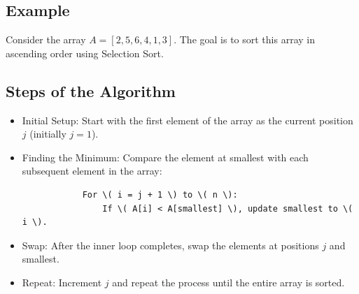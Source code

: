     \subsection{Example}
    Consider the array \( A = [2, 5, 6, 4, 1, 3] \). The goal is to sort this array in ascending order using Selection Sort.
    
    \subsection{Steps of the Algorithm}
    \begin{itemize}
        \item Initial Setup: Start with the first element of the array as the current position \( j \) (initially \( j = 1 \)).
        \item Finding the Minimum: Compare the element at smallest with each subsequent element in the array:
        \begin{verbatim}
            For \( i = j + 1 \) to \( n \):
                If \( A[i] < A[smallest] \), update smallest to \( i \).
        \end{verbatim}
        \item Swap: After the inner loop completes, swap the elements at positions \( j \) and smallest.
        \item Repeat: Increment \( j \) and repeat the process until the entire array is sorted.
    \end{itemize}
    
